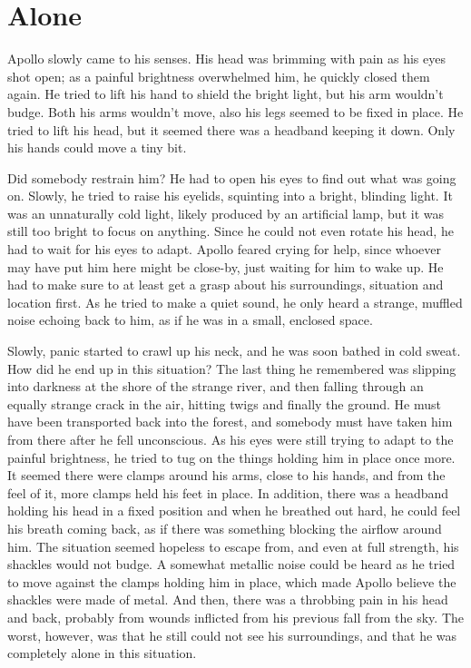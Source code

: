\chapter{Alone}
\label{cha:alone}
Apollo slowly came to his senses. His head was brimming with pain as his eyes shot open; as a painful brightness overwhelmed him, he quickly closed them again. He tried to lift his hand to shield the bright light, but his arm wouldn't budge. Both his arms wouldn't move, also his legs seemed to be fixed in place. He tried to lift his head, but it seemed there was a headband keeping it down. Only his hands could move a tiny bit.

Did somebody restrain him? He had to open his eyes to find out what was going on. Slowly, he tried to raise his eyelids, squinting into a bright, blinding light. It was an unnaturally cold light, likely produced by an artificial lamp, but it was still too bright to focus on anything. Since he could not even rotate his head, he had to wait for his eyes to adapt. Apollo feared crying for help, since whoever may have put him here might be close-by, just waiting for him to wake up. He had to make sure to at least get a grasp about his surroundings, situation and location first. As he tried to make a quiet sound, he only heard a strange, muffled noise echoing back to him, as if he was in a small, enclosed space.

Slowly, panic started to crawl up his neck, and he was soon bathed in cold sweat. How did he end up in this situation? The last thing he remembered was slipping into darkness at the shore of the strange river, and then falling through an equally strange crack in the air, hitting twigs and finally the ground. He must have been transported back into the forest, and somebody must have taken him from there after he fell unconscious. As his eyes were still trying to adapt to the painful brightness, he tried to tug on the things holding him in place once more. It seemed there were clamps around his arms, close to his hands, and from the feel of it, more clamps held his feet in place. In addition, there was a headband holding his head in a fixed position and when he breathed out hard, he could feel his breath coming back, as if there was something blocking the airflow around him. The situation seemed hopeless to escape from, and even at full strength, his shackles would not budge. A somewhat metallic noise could be heard as he tried to move against the clamps holding him in place, which made Apollo believe the shackles were made of metal. And then, there was a throbbing pain in his head and back, probably from wounds inflicted from his previous fall from the sky. The worst, however, was that he still could not see his surroundings, and that he was completely alone in this situation.

